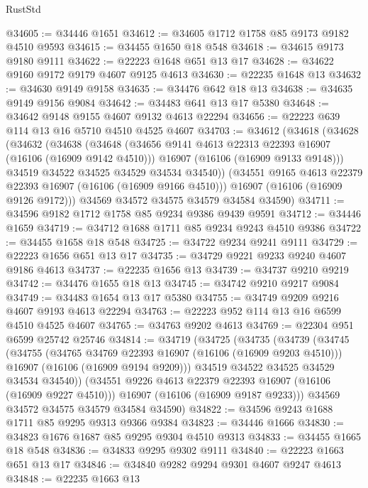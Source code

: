 \begin{lexlean}{RustStd}
\begin{coremodule}
@34605 := @34446 @1651
@34612 := @34605 @1712 @1758 @85 @9173 @9182 @4510 @9593
@34615 := @34455 @1650 @18 @548
@34618 := @34615 @9173 @9180 @9111
@34622 := @22223 @1648 @651 @13 @17
@34628 := @34622 @9160 @9172 @9179 @4607 @9125 @4613
@34630 := @22235 @1648 @13
@34632 := @34630 @9149 @9158
@34635 := @34476 @642 @18 @13
@34638 := @34635 @9149 @9156 @9084
@34642 := @34483 @641 @13 @17 @5380
@34648 := @34642 @9148 @9155 @4607 @9132 @4613 @22294
@34656 := @22223 @639 @114 @13 @16 @5710 @4510 @4525 @4607
@34703 := @34612
    (@34618
      (@34628
        (@34632
          (@34638
            (@34648
              (@34656 @9141 @4613 @22313 @22393 @16907 (@16106 (@16909 @9142 @4510)))
              @16907
              (@16106 (@16909 @9133 @9148)))
            @34519
            @34522
            @34525
            @34529
            @34534
            @34540))
        (@34551 @9165 @4613 @22379 @22393 @16907 (@16106 (@16909 @9166 @4510)))
        @16907
        (@16106 (@16909 @9126 @9172)))
      @34569
      @34572
      @34575
      @34579
      @34584
      @34590)
@34711 := @34596 @9182 @1712 @1758 @85 @9234 @9386 @9439 @9591
@34712 := @34446 @1659
@34719 := @34712 @1688 @1711 @85 @9234 @9243 @4510 @9386
@34722 := @34455 @1658 @18 @548
@34725 := @34722 @9234 @9241 @9111
@34729 := @22223 @1656 @651 @13 @17
@34735 := @34729 @9221 @9233 @9240 @4607 @9186 @4613
@34737 := @22235 @1656 @13
@34739 := @34737 @9210 @9219
@34742 := @34476 @1655 @18 @13
@34745 := @34742 @9210 @9217 @9084
@34749 := @34483 @1654 @13 @17 @5380
@34755 := @34749 @9209 @9216 @4607 @9193 @4613 @22294
@34763 := @22223 @952 @114 @13 @16 @6599 @4510 @4525 @4607
@34765 := @34763 @9202 @4613
@34769 := @22304 @951 @6599 @25742 @25746
@34814 := @34719
    (@34725
      (@34735
        (@34739
          (@34745
            (@34755
              (@34765 @34769 @22393 @16907 (@16106 (@16909 @9203 @4510)))
              @16907
              (@16106 (@16909 @9194 @9209)))
            @34519
            @34522
            @34525
            @34529
            @34534
            @34540))
        (@34551 @9226 @4613 @22379 @22393 @16907 (@16106 (@16909 @9227 @4510)))
        @16907
        (@16106 (@16909 @9187 @9233)))
      @34569
      @34572
      @34575
      @34579
      @34584
      @34590)
@34822 := @34596 @9243 @1688 @1711 @85 @9295 @9313 @9366 @9384
@34823 := @34446 @1666
@34830 := @34823 @1676 @1687 @85 @9295 @9304 @4510 @9313
@34833 := @34455 @1665 @18 @548
@34836 := @34833 @9295 @9302 @9111
@34840 := @22223 @1663 @651 @13 @17
@34846 := @34840 @9282 @9294 @9301 @4607 @9247 @4613
@34848 := @22235 @1663 @13

\end{coremodule}
\end{lexlean}
